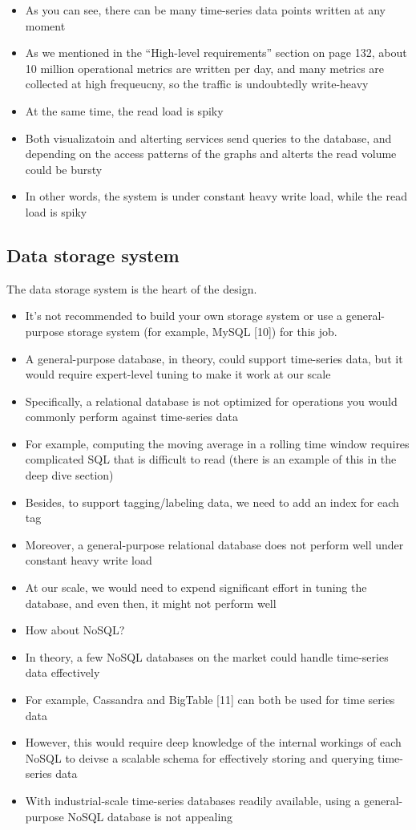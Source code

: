 \documentclass{report}
\theoremstyle{definition}
\let\oldsubsection\subsection
\renewcommand{\subsection}{\oldsubsection*}
\begin{document}
\begin{itemize}
\item
As you can see, there can be many time-series data points written at any moment
\item
As we mentioned in the ``High-level requirements'' section on page 132, about 10 million operational metrics are written per day, and many metrics are collected at high frequeucny, so the traffic is undoubtedly write-heavy
\item
At the same time, the read load is spiky
\item
Both visualizatoin and alterting services send queries to the database, and depending on the access patterns of the graphs and alterts the read volume could be bursty
\item
In other words, the system is under constant heavy write load, while the read load is spiky
\end{itemize}

\subsection{Data storage system}

The data storage system is the heart of the design.

\begin{itemize}
\item
It's not recommended to build your own storage system or use a general-purpose storage system (for example, MySQL [10]) for this job.
\item
A general-purpose database, in theory, could support time-series data, but it would require expert-level tuning to make it work at our scale
\item
Specifically, a relational database is not optimized for operations you would commonly perform against time-series data
\item
For example, computing the moving average in a rolling time window requires complicated SQL that is difficult to read (there is an example of this in the deep dive section)
\item
Besides, to support tagging/labeling data, we need to add an index for each tag
\item
Moreover, a general-purpose relational database does not perform well under constant heavy write load
\item
At our scale, we would need to expend significant effort in tuning the database, and even then, it might not perform well
\item
How about NoSQL?
\item
In theory, a few NoSQL databases on the market could handle time-series data effectively
\item
For example, Cassandra and BigTable [11] can both be used for time series data
\item
However, this would require deep knowledge of the internal workings of each NoSQL to deivse a scalable schema for effectively storing and querying time-series data
\item
With industrial-scale time-series databases readily available, using a general-purpose NoSQL database is not appealing
\end{itemize}
\end{document}
